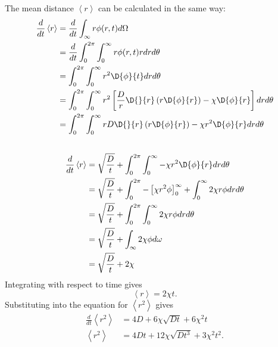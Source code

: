 %
The mean distance $ \left<r\right>$ can be calculated in the same way:
%
\begin{equation}
\begin{split}
\frac{d}{dt} \left<r\right> &= \frac{d}{dt}\int_{\infty}r \phi(r,t) d\Omega \\
                              &= \frac{d}{dt} \int_0^{2\pi}\int_0^{\infty} r \phi(r,t)r dr d\theta \\
                              &= \int_0^{2\pi} \int_0^{\infty} r^2 \D{\phi}{t} dr d\theta \\
                              &= \int_0^{2\pi} \int_0^{\infty} r^2 \left[ \frac{D}{r} \D{}{r}\left(r \D{\phi}{r}\right)-\chi\D{\phi}{r} \right] dr d\theta \\
                              &= \int_0^{2\pi} \int_0^{\infty} rD  \D{}{r}\left(r \D{\phi}{r}\right) -  \chi r^2 \D{\phi}{r} dr d\theta \\
\nonumber
\end{split}
\end{equation}
%
\begin{equation}
\begin{split}
\frac{d}{dt} \left<r\right> &= \sqrt{\frac{D}{t}} + \int_0^{2\pi} \int_0^{\infty} -  \chi r^2 \D{\phi}{r} dr d\theta \\
                            &= \sqrt{\frac{D}{t}} + \int_0^{2\pi} - \left[ \chi r^2 \phi \right]_0^{\infty} + \int_0^{\infty} 2 \chi r \phi dr d\theta \\
                            &= \sqrt{\frac{D}{t}} + \int_0^{2\pi} \int_0^{\infty} 2 \chi r \phi dr d\theta \\
                            &= \sqrt{\frac{D}{t}} + \int_{\infty} 2 \chi \phi d\omega \\
                            &= \sqrt{\frac{D}{t}} + 2\chi
\nonumber
\end{split}
\end{equation}
%
Integrating with respect to time gives
%
\begin{equation}
\left<r\right> = 2\chi t .
\nonumber
\end{equation}
%
Substituting into the equation for $\left<r^2\right>$ gives
%
\begin{equation}
\begin{split}
\frac{d}{dt} \left<r^2\right> &= 4D + 6\chi\sqrt{Dt}  + 6\chi^2t \\
\left<r^2\right>              &= 4Dt + 12\chi\sqrt{Dt^3} + 3\chi^2t^2 .
\label{eqn:AD_msd}
\end{split}
\end{equation}
%
